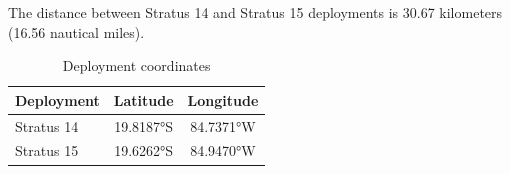 
The distance between Stratus 14 and Stratus 15 deployments is 30.67 kilometers (16.56 nautical miles).

\begin{table}[ht]
\centering
\caption{Deployment coordinates}
\begin{tabular}{lcc}
\hline
\textbf{Deployment} & \textbf{Latitude} & \textbf{Longitude} \\
\hline
Stratus 14 & 19.8187°S & 84.7371°W \\
Stratus 15 & 19.6262°S & 84.9470°W \\
\hline
\end{tabular}
\end{table}
